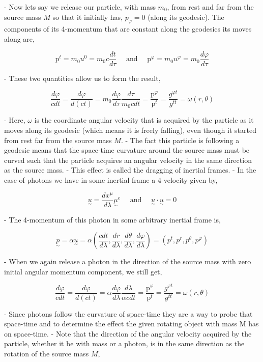 - Now lets say we release our particle, with mass $m_0$, from rest and far from the source mass $M$ so that it initially has, $p_{\varphi}=0$ (along its geodesic). The components of its 4-momentum that are constant along the geodesics its moves along are,

$$
    \mathrm{p}^t=m_0 u^0=m_0 c \frac{d t}{d \tau} \quad \text { and } \quad \mathrm{p}^{\varphi}=m_0 u^{\varphi}=m_0 \frac{d \varphi}{d \tau}
$$

- These two quantities allow us to form the result,

$$
    \frac{d \varphi}{c d t}=\frac{d \varphi}{d(c t)}=m_0 \frac{d \varphi}{d \tau} \frac{d \tau}{m_0 c d t}=\frac{\mathrm{p}^{\varphi}}{\mathrm{p}^t}=\frac{g^{\varphi t}}{g^{t t}}=\omega(r, \theta)
$$

- Here, $\omega$ is the coordinate angular velocity that is acquired by the particle as it moves along its geodesic (which means it is freely falling), even though it started from rest far from the source mass $M$.
- The fact this particle is following a geodesic means that the space-time curvature around the source mass must be curved such that the particle acquires an angular velocity in the same direction as the source mass.
- This effect is called the dragging of inertial frames.
- In the case of photons we have in some inertial frame a 4-velocity given by,

$$
    \underset{\sim}{u}=\frac{d x^\mu}{d \lambda}{\underset{\sim}{\mu}}^e \quad \text { and } \quad \underset{\sim}{u} \cdot \underset{\sim}{u}=0
$$

- The 4-momentum of this photon in some arbitrary inertial frame is,

$$
    \underset{\sim}{p}=\alpha \underset{\sim}{u}=\alpha\left(\frac{c d t}{d \lambda}, \frac{d r}{d \lambda}, \frac{d \theta}{d \lambda}, \frac{d \varphi}{d \lambda}\right)=\left(p^t, p^r, p^\theta, p^{\varphi}\right)
$$

- When we again release a photon in the direction of the source mass with zero initial angular momentum component, we still get,

$$
    \frac{d \varphi}{c d t}=\frac{d \varphi}{d(c t)}=\alpha \frac{d \varphi}{d \lambda} \frac{d \lambda}{\alpha c d t}=\frac{\mathrm{p}^{\varphi}}{\mathrm{p}^t}=\frac{g^{\varphi t}}{g^{t t}}=\omega(r, \theta)
$$

- Since photons follow the curvature of space-time they are a way to probe that space-time and to determine the effect the given rotating object with mass M has on space-time.
- Note that the direction of the angular velocity acquired by the particle, whether it be with mass or a photon, is in the same direction as the rotation of the source mass $M$,

